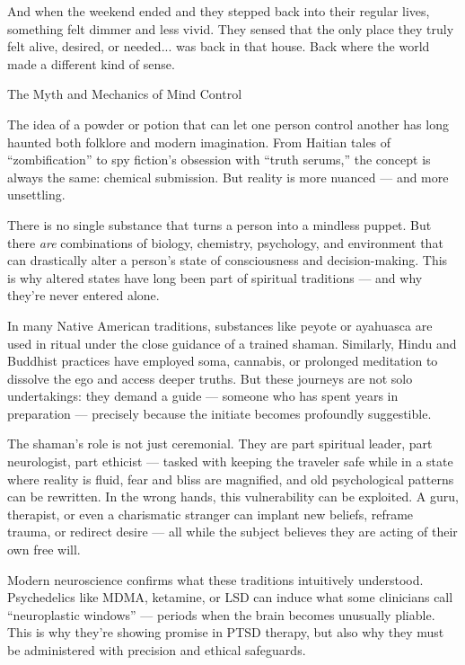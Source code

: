 And when the weekend ended and they stepped back 
into their regular lives, something felt dimmer and less vivid. 
They sensed that the only place they truly felt alive, 
desired, or needed... was back in that house. 
Back where the world made a different kind of sense.

\medskip

\begin{PsychologicalSidebar}{The Myth and Mechanics of Mind Control}

  The idea of a powder or potion that can let one person control another has long haunted both folklore and modern 
  imagination. From Haitian tales of “zombification” to spy fiction's obsession with “truth serums,” the concept is 
  always the same: chemical submission. But reality is more nuanced — and more unsettling.

  \medskip
  
  There is no single substance that turns a person into a mindless puppet. But there \emph{are} combinations of biology, 
  chemistry, psychology, and environment that can drastically alter a person’s state of consciousness and decision-making. 
  This is why altered states have long been part of spiritual traditions — and why they’re never entered alone.

  \medskip
  
  In many Native American traditions, substances like peyote or ayahuasca are used in ritual under the close guidance of 
  a trained shaman. Similarly, Hindu and Buddhist practices have employed soma, cannabis, or prolonged meditation 
  to dissolve the ego and access deeper truths. But these journeys are not solo undertakings: they demand a guide — 
  someone who has spent years in preparation — precisely because the initiate becomes profoundly suggestible. 

  \medskip
  
  The shaman’s role is not just ceremonial. They are part spiritual leader, part neurologist, part ethicist — tasked with 
  keeping the traveler safe while in a state where reality is fluid, fear and bliss are magnified, and old psychological 
  patterns can be rewritten. In the wrong hands, this vulnerability can be exploited. A guru, therapist, or even a 
  charismatic stranger can implant new beliefs, reframe trauma, or redirect desire — all while the subject believes they 
  are acting of their own free will.

  \medskip
  
  Modern neuroscience confirms what these traditions intuitively understood. Psychedelics like MDMA, ketamine, or LSD 
  can induce what some clinicians call “neuroplastic windows” — periods when the brain becomes unusually pliable. This 
  is why they’re showing promise in PTSD therapy, but also why they must be administered with precision and ethical 
  safeguards. 


\end{PsychologicalSidebar}
